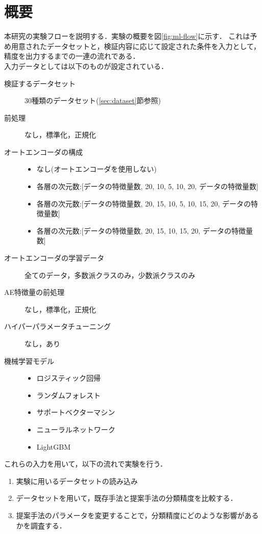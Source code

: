 \section{概要}
本研究の実験フローを説明する．実験の概要を図\ref{fig:ml-flow}に示す．
これは予め用意されたデータセットと，検証内容に応じて設定された条件を入力として，精度を出力するまでの一連の流れである．\\

入力データとしては以下のものが設定されている．
\begin{description}
    \item [検証するデータセット] 30種類のデータセット(\ref{sec:dataset}節参照)
    \item [前処理] なし，標準化，正規化
    \item [オートエンコーダの構成] \mbox{}
        \begin{itemize}
            \item なし(オートエンコーダを使用しない)
            \item 各層の次元数:[データの特徴量数, 20, 10, 5, 10, 20, データの特徴量数]
            \item 各層の次元数:[データの特徴量数, 20, 15, 10, 5, 10, 15, 20, データの特徴量数]
            \item 各層の次元数:[データの特徴量数, 20, 15, 10, 15, 20, データの特徴量数]
        \end{itemize}
    \item [オートエンコーダの学習データ] 全てのデータ，多数派クラスのみ，少数派クラスのみ
    \item [AE特徴量の前処理] なし，標準化，正規化
    \item [ハイパーパラメータチューニング] なし，あり
    \item [機械学習モデル] \mbox{}
    \begin{itemize}
        \item ロジスティック回帰
        \item ランダムフォレスト
        \item サポートベクターマシン
        \item ニューラルネットワーク
        \item LightGBM
    \end{itemize} 
\end{description}

これらの入力を用いて，以下の流れで実験を行う．

\begin{enumerate}
  \item 実験に用いるデータセットの読み込み
  \item データセットを用いて，既存手法と提案手法の分類精度を比較する．
  \item 提案手法のパラメータを変更することで，分類精度にどのような影響があるかを調査する．
\end{enumerate}

